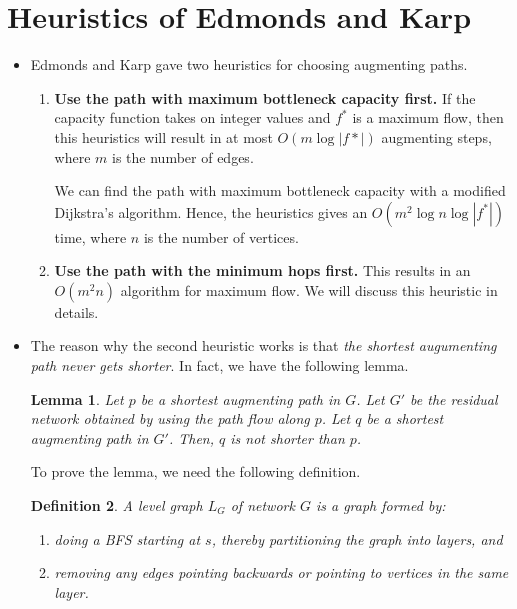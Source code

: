 \documentclass[10pt]{article}
\newtheorem{lemma}{Lemma}[section]
\newtheorem{definition}[lemma]{Definition}
\begin{document}
  \section{Heuristics of Edmonds and Karp}
    \begin{itemize}
      \item Edmonds and Karp gave two heuristics for choosing augmenting paths.
        \begin{enumerate}
          \item {\bf Use the path with maximum bottleneck capacity first.} 
            If the capacity function takes on integer values and $f^*$ is a
            maximum flow, then this heuristics will result in at most $O(m \log |f*|)$
            augmenting steps, where $m$ is the number of edges.
            
            We can find the path with maximum bottleneck capacity
            with a modified Dijkstra's algorithm. Hence, the heuristics
            gives an $O(m^2 \log n \log |f^*| )$ time, where $n$
            is the number of vertices.
            
          \item {\bf Use the path with the minimum hops first.} This
            results in an $O(m^2 n)$ algorithm for maximum flow.
            We will discuss this heuristic in details.
        \end{enumerate}
      
      \item The reason why the second heuristic works is that
        \emph{the shortest augumenting path never gets shorter}.
        In fact, we have the following lemma.
        
        \begin{lemma} \label{augmenting-path-no-shorter}
          Let $p$ be a shortest augmenting path in $G$.
          Let $G'$ be the residual network obtained by using the 
          path flow along $p$. Let $q$ be a shortest augmenting
          path in $G'$. Then, $q$ is not shorter than $p$.
        \end{lemma}
        
        To prove the lemma, we need the following definition.
        
        \begin{definition}
          A \emph{level graph} $L_G$ of network $G$ is a graph formed
          by: 
          \begin{enumerate}
            \item doing a BFS starting at $s$, thereby partitioning the graph into layers, and
            \item removing any edges pointing backwards or pointing to vertices in the same layer.
          \end{enumerate}
        \end{definition}
        

\end{itemize}
\end{document}
